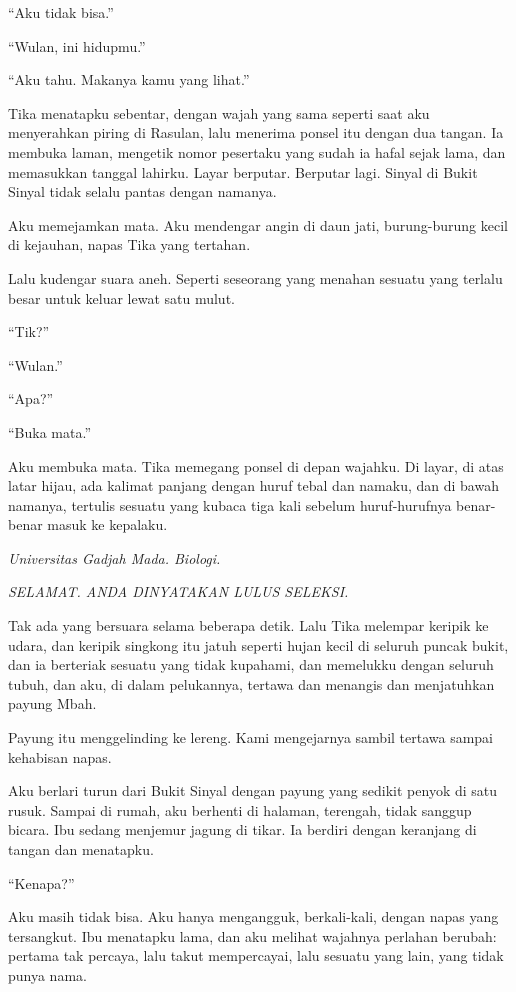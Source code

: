 \documentclass[11pt,twoside,openany]{book}
\makeatletter
\newcommand{\scenebreak}{\par\vspace{0.9em}{\centering\textsc{*\hspace{0.7em}*\hspace{0.7em}*}\par}\vspace{0.9em}\@afterindentfalse\@afterheading}
\makeatother
\begin{document}
``Aku tidak bisa.''

``Wulan, ini hidupmu.''

``Aku tahu. Makanya kamu yang lihat.''

Tika menatapku sebentar, dengan wajah yang sama seperti saat aku menyerahkan piring di Rasulan, lalu menerima ponsel itu dengan dua tangan. Ia membuka laman, mengetik nomor pesertaku yang sudah ia hafal sejak lama, dan memasukkan tanggal lahirku. Layar berputar. Berputar lagi. Sinyal di Bukit Sinyal tidak selalu pantas dengan namanya.

Aku memejamkan mata. Aku mendengar angin di daun jati, burung-burung kecil di kejauhan, napas Tika yang tertahan.

Lalu kudengar suara aneh. Seperti seseorang yang menahan sesuatu yang terlalu besar untuk keluar lewat satu mulut.

``Tik?''

``Wulan.''

``Apa?''

``Buka mata.''

Aku membuka mata. Tika memegang ponsel di depan wajahku. Di layar, di atas latar hijau, ada kalimat panjang dengan huruf tebal dan namaku, dan di bawah namanya, tertulis sesuatu yang kubaca tiga kali sebelum huruf-hurufnya benar-benar masuk ke kepalaku.

\emph{Universitas Gadjah Mada. Biologi.}

\emph{SELAMAT. ANDA DINYATAKAN LULUS SELEKSI.}

Tak ada yang bersuara selama beberapa detik. Lalu Tika melempar keripik ke udara, dan keripik singkong itu jatuh seperti hujan kecil di seluruh puncak bukit, dan ia berteriak sesuatu yang tidak kupahami, dan memelukku dengan seluruh tubuh, dan aku, di dalam pelukannya, tertawa dan menangis dan menjatuhkan payung Mbah.

Payung itu menggelinding ke lereng. Kami mengejarnya sambil tertawa sampai kehabisan napas.

\scenebreak
Aku berlari turun dari Bukit Sinyal dengan payung yang sedikit penyok di satu rusuk. Sampai di rumah, aku berhenti di halaman, terengah, tidak sanggup bicara. Ibu sedang menjemur jagung di tikar. Ia berdiri dengan keranjang di tangan dan menatapku.

``Kenapa?''

Aku masih tidak bisa. Aku hanya mengangguk, berkali-kali, dengan napas yang tersangkut. Ibu menatapku lama, dan aku melihat wajahnya perlahan berubah: pertama tak percaya, lalu takut mempercayai, lalu sesuatu yang lain, yang tidak punya nama.
\end{document}
